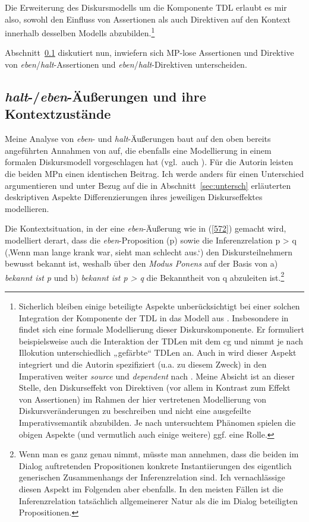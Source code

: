 Die Erweiterung des Diskursmodells um die Komponente TDL erlaubt es mir also, sowohl den Einfluss von Assertionen als auch Direktiven auf den Kontext innerhalb desselben Modells abzubilden.\footnote{Sicherlich bleiben einige beteiligte Aspekte unberücksichtigt bei einer solchen Integration der Komponente der TDL in das Modell aus \citet{Farkas2010}. Insbesondere in \citet{Portner2007} findet sich eine formale Modellierung dieser Diskurskomponente. Er formuliert beispielsweise auch die Interaktion der TDLen mit dem cg und nimmt je nach Illokution unterschiedlich „gefärbte“ TDLen an. Auch in \citet{Farkas2011} wird dieser Aspekt integriert und die Autorin spezifiziert (u.a. zu diesem Zweck) in den Imperativen weiter \textit{source} und \textit{dependent} nach \citet{Gunlogson2008}. Meine Absicht ist an dieser Stelle, den Diskurseffekt von Direktiven (vor allem in Kontrast zum Effekt von Assertionen) im Rahmen der hier vertretenen Modellierung von Diskursveränderungen zu beschreiben und nicht eine ausgefeilte Imperativsemantik abzubilden. Je nach untersuchtem Phänomen spielen die obigen Aspekte (und vermutlich auch einige weitere) ggf. eine Rolle.}

Abschnitt~\ref{sec:kontexte} diskutiert nun, inwiefern sich MP-lose Assertionen und Direktive von \textit{eben}/\textit{halt}-Assertionen und \textit{eben}/\textit{halt}-Direktiven unterscheiden.

\subsection{\textit{halt}-/\textit{eben}-Äußerungen und ihre Kontextzustände}
\label{sec:kontexte}
Meine Analyse von \textit{eben}- und \textit{halt}-Äußerungen baut auf den oben bereits angeführten Annahmen von \citet{Karagjosova2003, Karagjosova2004} auf, die ebenfalls eine Modellierung in einem formalen Diskursmodell vorgeschlagen hat (vgl.\ auch \citealt[152--159]{Mueller2016a}). Für die Autorin leisten die beiden MPn einen identi\-schen Beitrag. Ich werde anders für einen Unterschied argumentieren und unter Bezug auf die in Abschnitt~\ref{sec:untersch} erläuterten deskriptiven Aspekte Differenzierungen ihres jeweiligen Diskurseffektes modellieren.\largerpage[1.5]

Die Kontextsituation, in der eine \textit{eben}-Äußerung wie in (\ref{572}) gemacht wird, modelliert \citet[208]{Karagjosova2004} derart, dass die \textit{eben}-Proposition (p) sowie die Inferenzrelation p > q (‚Wenn man lange krank war, sieht man schlecht aus.‘) den Diskursteilnehmern bewusst bekannt ist, weshalb über den \textit{Modus Ponens} auf der Basis von a) \textit{bekannt ist p} und b) \textit{bekannt ist p > q} die Bekanntheit von q abzuleiten ist.\footnote{ Wenn man es ganz genau nimmt, müsste man annehmen, dass die beiden im Dialog auftretenden Propositionen konkrete Instantiierungen des eigentlich generischen Zusammenhangs der Inferenzrelation sind. Ich vernachlässige diesen Aspekt im Folgenden aber ebenfalls. In den meisten Fällen ist die Inferenzrelation tatsächlich allgemeinerer Natur als die im Dialog beteiligten Propositionen.}

